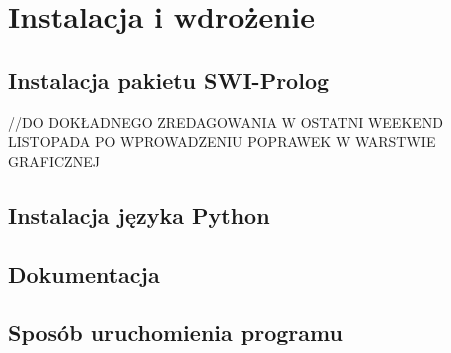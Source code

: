 \chapter{Instalacja i wdrożenie}
\thispagestyle{chapterBeginStyle}

\section{Instalacja pakietu SWI-Prolog}
\label{SWI-PROLOGRozdzial}
//DO DOKŁADNEGO ZREDAGOWANIA W OSTATNI WEEKEND LISTOPADA PO WPROWADZENIU POPRAWEK W WARSTWIE GRAFICZNEJ
\section{Instalacja języka Python}

\section{Dokumentacja}

\section{Sposób uruchomienia programu}
